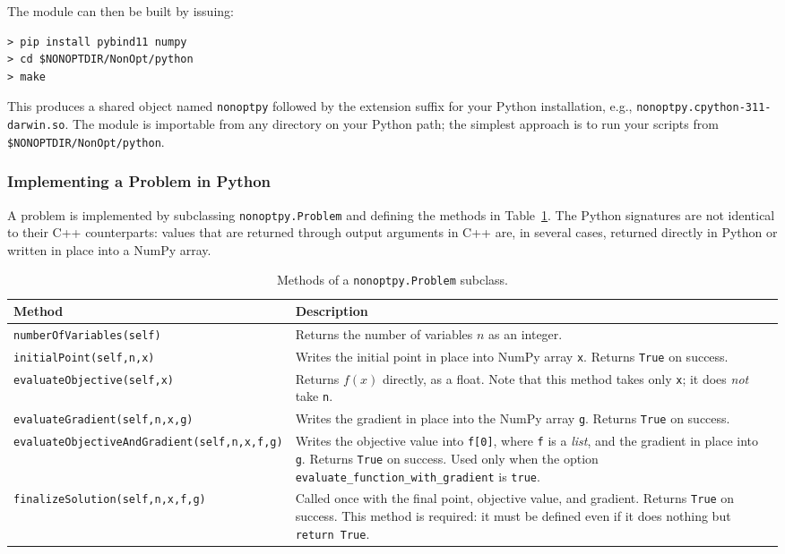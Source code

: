\documentclass{article}
\begin{document}
The module can then be built by issuing:

\begin{verbatim}
> pip install pybind11 numpy
> cd $NONOPTDIR/NonOpt/python
> make
\end{verbatim}

This produces a shared object named \texttt{nonoptpy} followed by the extension suffix for your Python installation, e.g., \texttt{nonoptpy.cpython-311-darwin.so}.  The module is importable from any directory on your Python path; the simplest approach is to run your scripts from \texttt{\$NONOPTDIR/NonOpt/python}.

\subsubsection{Implementing a Problem in Python}

A problem is implemented by subclassing \texttt{nonoptpy.Problem} and defining the methods in Table~\ref{tab.python}.  The Python signatures are not identical to their C++ counterparts: values that are returned through output arguments in C++ are, in several cases, returned directly in Python or written in place into a NumPy array.

\begin{table}[ht]
\centering
\begin{tabular}{|l|p{8.2cm}|}
\hline
\textbf{Method} & \textbf{Description} \\
\hline
\texttt{numberOfVariables(self)} & Returns the number of variables $n$ as an integer. \\
\hline
\texttt{initialPoint(self,n,x)} & Writes the initial point in place into NumPy array \texttt{x}.  Returns \texttt{True} on success. \\
\hline
\texttt{evaluateObjective(self,x)} & Returns $f(x)$ directly, as a float.  Note that this method takes only \texttt{x}; it does \emph{not} take \texttt{n}. \\
\hline
\texttt{evaluateGradient(self,n,x,g)} & Writes the gradient in place into the NumPy array \texttt{g}.  Returns \texttt{True} on success. \\
\hline
\texttt{evaluateObjectiveAndGradient(self,n,x,f,g)} & Writes the objective value into \texttt{f[0]}, where \texttt{f} is a \emph{list}, and the gradient in place into \texttt{g}.  Returns \texttt{True} on success.  Used only when the option \texttt{evaluate\_function\_with\_gradient} is \texttt{true}. \\
\hline
\texttt{finalizeSolution(self,n,x,f,g)} & Called once with the final point, objective value, and gradient.  Returns \texttt{True} on success.  This method is required: it must be defined even if it does nothing but \texttt{return True}. \\
\hline
\end{tabular}
\caption{Methods of a \texttt{nonoptpy.Problem} subclass.}\label{tab.python}
\end{table}
\end{document}
